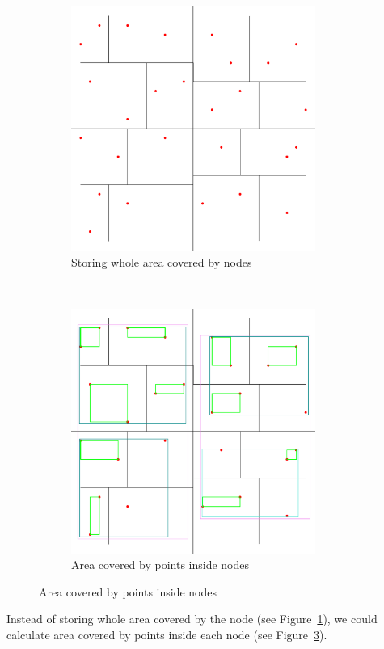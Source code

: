 \documentclass[10pt,a4paper]{article}
\begin{document}
\begin{figure}
        \centering
        \begin{subfigure}[b]{0.42\textwidth}
                \centering
                \includegraphics[width=8cm]{Figure1}
      		\caption{Storing whole area covered by nodes}
  				\label{fig:covered}
        \end{subfigure}%
        \qquad\qquad\qquad
        ~ %
        \begin{subfigure}[b]{0.42\textwidth}
                \centering
 				\includegraphics[width=8cm]{Figure2}
 				 \caption{Area covered by points inside nodes}
 				 \label{fig:inside}
        \end{subfigure}
        
\end{figure}

Instead of storing whole area covered by the node (see Figure~\ref{fig:covered}), we could calculate area covered by points inside each node (see Figure~\ref{fig:inside}).
\end{document}
